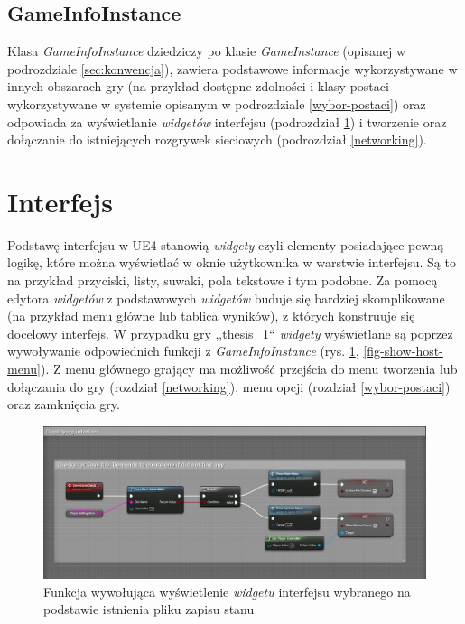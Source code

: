 \documentclass[multip]{SGGW-thesis}
\begin{document}
	\subsection{GameInfoInstance}
		\label{gameinfoinstance}
		Klasa {\em GameInfoInstance} dziedziczy po klasie {\em GameInstance} (opisanej w podrozdziale \ref{sec:konwencja}), zawiera podstawowe informacje wykorzystywane w innych obszarach gry (na przykład dostępne zdolności i klasy postaci wykorzystywane w systemie opisanym w podrozdziale \ref{wybor-postaci}) oraz odpowiada za wyświetlanie {\em widgetów} interfejsu (podrozdział \ref{interface}) i tworzenie oraz dołączanie do istniejących rozgrywek sieciowych (podrozdział \ref{networking}).
	

\section{Interfejs}
	\label{interface}
	Podstawę interfejsu w UE4 stanowią {\em widgety} czyli elementy posiadające pewną logikę, które można wyświetlać w oknie użytkownika w warstwie interfejsu. Są to na przykład przyciski, listy, suwaki, pola tekstowe i tym podobne. Za pomocą edytora {\em widgetów} z podstawowych {\em widgetów} buduje się bardziej skomplikowane (na przykład menu główne lub tablica wyników), z których konstruuje się docelowy interfejs.
\newline \indent W przypadku gry ,,thesis\_1`` {\em widgety} wyświetlane są poprzez wywoływanie odpowiednich funkcji z {\em GameInfoInstance} (rys. \ref{fig-save-game-check}, \ref{fig-show-host-menu}). 
\newline \indent Z menu głównego grający ma możliwość przejścia do menu tworzenia lub dołączania do gry (rozdział \ref{networking}), menu opcji (rozdział \ref{wybor-postaci}) oraz zamknięcia gry.

	\begin{figure}
		\centering
			\includegraphics[width=1\textwidth]{figures/savegamecheck.jpg}
		\caption{Funkcja wywołująca wyświetlenie {\em widgetu} interfejsu wybranego na podstawie istnienia pliku zapisu stanu}
		\label{fig-save-game-check}
	\end{figure}
	
\end{document}

